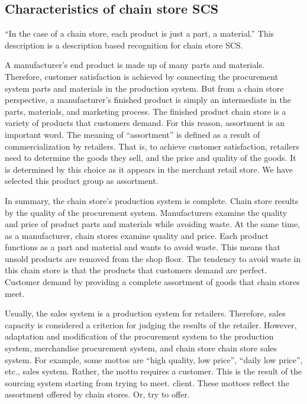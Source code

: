 \documentclass[]{article}
\begin{document}
\hypertarget{characteristics-of-chain-store-scs}{%
\subsection{Characteristics of chain store
SCS}\label{characteristics-of-chain-store-scs}}

``In the case of a chain store, each product is just a part, a
material.'' This description is a description based recognition for
chain store SCS.

A manufacturer's end product is made up of many parts and materials.
Therefore, customer satisfaction is achieved by connecting the
procurement system parts and materials in the production system. But
from a chain store perspective, a manufacturer's finished product is
simply an intermediate in the parts, materials, and marketing process.
The finished product chain store is a variety of products that customers
demand. For this reason, assortment is an important word. The meaning of
``assortment'' is defined as a result of commercialization by retailers.
That is, to achieve customer satisfaction, retailers need to determine
the goods they sell, and the price and quality of the goods. It is
determined by this choice as it appears in the merchant retail store. We
have selected this product group as assortment.

In summary, the chain store's production system is complete. Chain store
results by the quality of the procurement system. Manufacturers examine
the quality and price of product parts and materials while avoiding
waste. At the same time, as a manufacturer, chain stores examine quality
and price. Each product functions as a part and material and wants to
avoid waste. This means that unsold products are removed from the shop
floor. The tendency to avoid waste in this chain store is that the
products that customers demand are perfect. Customer demand by providing
a complete assortment of goods that chain stores meet.

Usually, the sales system is a production system for retailers.
Therefore, sales capacity is considered a criterion for judging the
results of the retailer. However, adaptation and modification of the
procurement system to the production system, merchandise procurement
system, and chain store chain store sales system. For example, some
mottos are ``high quality, low price'', ``daily low price'', etc., sales
system. Rather, the motto requires a customer. This is the result of the
sourcing system starting from trying to meet. client. These mottoes
reflect the assortment offered by chain stores. Or, try to offer.
\end{document}
